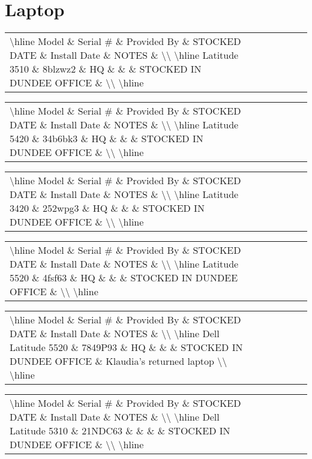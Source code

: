 \documentclass{article}%
\begin{document}
\section{Laptop}%
\label{sec:Laptop}%
\begin{tabularx}{\textwidth}{|X|X|X|X|X|X|X|}%
\textbackslash{}hline%
Model \& Serial \# \& Provided By \& STOCKED DATE \& Install Date \& NOTES \&  \textbackslash{}\textbackslash{}%
\textbackslash{}hline%
Latitude 3510 \& 8blzwz2 \& HQ \&  \&  \& STOCKED IN DUNDEE OFFICE \&  \textbackslash{}\textbackslash{}%
\textbackslash{}hline%
\end{tabularx}%
\begin{tabularx}{\textwidth}{|X|X|X|X|X|X|X|}%
\textbackslash{}hline%
Model \& Serial \# \& Provided By \& STOCKED DATE \& Install Date \& NOTES \&  \textbackslash{}\textbackslash{}%
\textbackslash{}hline%
Latitude 5420 \& 34b6bk3 \& HQ \&  \&  \& STOCKED IN DUNDEE OFFICE \&  \textbackslash{}\textbackslash{}%
\textbackslash{}hline%
\end{tabularx}%
\begin{tabularx}{\textwidth}{|X|X|X|X|X|X|X|}%
\textbackslash{}hline%
Model \& Serial \# \& Provided By \& STOCKED DATE \& Install Date \& NOTES \&  \textbackslash{}\textbackslash{}%
\textbackslash{}hline%
Latitude 3420 \& 252wpg3 \& HQ \&  \&  \& STOCKED IN DUNDEE OFFICE \&  \textbackslash{}\textbackslash{}%
\textbackslash{}hline%
\end{tabularx}%
\begin{tabularx}{\textwidth}{|X|X|X|X|X|X|X|}%
\textbackslash{}hline%
Model \& Serial \# \& Provided By \& STOCKED DATE \& Install Date \& NOTES \&  \textbackslash{}\textbackslash{}%
\textbackslash{}hline%
Latitude 5520 \& 4fsf63 \& HQ \&  \&  \& STOCKED IN DUNDEE OFFICE \&  \textbackslash{}\textbackslash{}%
\textbackslash{}hline%
\end{tabularx}%
\begin{tabularx}{\textwidth}{|X|X|X|X|X|X|X|}%
\textbackslash{}hline%
Model \& Serial \# \& Provided By \& STOCKED DATE \& Install Date \& NOTES \&  \textbackslash{}\textbackslash{}%
\textbackslash{}hline%
Dell Latitude 5520 \& 7849P93 \& HQ \&  \&  \& STOCKED IN DUNDEE OFFICE \& Klaudia's returned laptop \textbackslash{}\textbackslash{}%
\textbackslash{}hline%
\end{tabularx}%
\begin{tabularx}{\textwidth}{|X|X|X|X|X|X|X|}%
\textbackslash{}hline%
Model \& Serial \# \& Provided By \& STOCKED DATE \& Install Date \& NOTES \&  \textbackslash{}\textbackslash{}%
\textbackslash{}hline%
Dell Latitude 5310 \& 21NDC63 \&  \&  \&  \& STOCKED IN DUNDEE OFFICE \&  \textbackslash{}\textbackslash{}%
\textbackslash{}hline%
\end{tabularx}%
\end{document}

